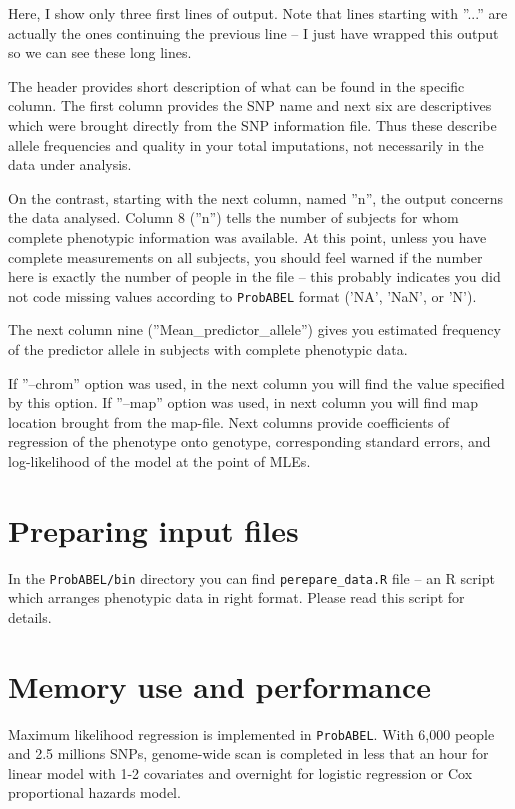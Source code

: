 \documentclass[12pt,a4paper]{article}
\begin{document}
Here, I show only three first lines of output. Note that lines 
starting with ''...'' are actually the ones continuing the 
previous line -- I just have wrapped this output so we can see 
these long lines. 

The header provides short description of what can be found in the 
specific column. The first column provides the SNP name and 
next six are descriptives which were brought directly from the 
SNP information file. Thus these describe allele frequencies and 
quality in your total imputations, not necessarily in the data under 
analysis. 

On the contrast, starting with the next column, named ''n'', 
the output concerns the data analysed. Column 8 (''n'') tells the 
number of subjects for whom complete phenotypic information was available. 
At this point, unless you have complete measurements on all 
subjects, you should feel warned if the number here is exactly the 
number of people in the file -- this probably indicates you did not code 
missing values according to \texttt{ProbABEL} format ('NA', 'NaN', or 'N').

The next column nine (''Mean\_predictor\_allele'') gives you estimated 
frequency of the predictor allele in subjects with complete phenotypic data. 

If ''--chrom'' option was used, in the next column you will find the 
value specified by this option. If ''--map'' option was used, in next 
column you will find map location brought from the map-file. Next 
columns provide coefficients of regression  of the phenotype 
onto genotype, corresponding standard errors, and log-likelihood %
of the model at the point of MLEs.

\section{Preparing input files}

In the \texttt{ProbABEL/bin} directory you can find \texttt{perepare\_data.R}
file -- an R script which arranges phenotypic data in right format. 
Please read this script for details.

\section{Memory use and performance}

Maximum likelihood regression is implemented in \texttt{ProbABEL}. With 6,000 
people and 2.5 millions SNPs, genome-wide scan is completed in less 
that an hour for linear model with 1-2 covariates and overnight 
for logistic regression or Cox proportional hazards model.
\end{document}
